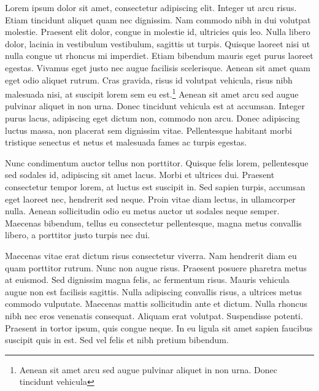 
{}
Lorem ipsum dolor sit amet, consectetur adipiscing elit.\citep{Nacuzzi:2007} Integer ut arcu risus. Etiam tincidunt aliquet quam nec dignissim. Nam commodo nibh in dui volutpat molestie. Praesent elit dolor, congue in molestie id, ultricies quis leo. Nulla libero dolor, lacinia in vestibulum vestibulum, sagittis ut turpis. Quisque laoreet nisi ut nulla congue ut rhoncus mi imperdiet. Etiam bibendum mauris eget purus laoreet egestas.\citep{Cooper:1939} Vivamus eget justo nec augue facilisis scelerisque. Aenean sit amet quam eget odio aliquet rutrum. Cras gravida, risus id volutpat vehicula, risus nibh malesuada nisi, at suscipit lorem sem eu est.\footnote{Aenean sit amet arcu sed augue pulvinar aliquet in non urna. Donec tincidunt vehicula} Aenean sit amet arcu sed augue pulvinar aliquet in non urna. Donec tincidunt vehicula est at accumsan. Integer purus lacus, adipiscing eget dictum non, commodo non arcu. Donec adipiscing luctus massa, non placerat sem dignissim vitae. Pellentesque habitant morbi tristique senectus et netus et malesuada fames ac turpis egestas.\citep{Fernandez:1892,carlin2010linguistics}

Nunc condimentum auctor tellus non porttitor.\citep{Febre:2005,algonquina:wigwams:online} Quisque felis lorem, pellentesque sed sodales id, adipiscing sit amet lacus. Morbi et ultrices dui. Praesent consectetur tempor lorem, at luctus est suscipit in. Sed sapien turpis, accumsan eget laoreet nec, hendrerit sed neque. Proin vitae diam lectus, in ullamcorper nulla.\citep{Sultzman:1999} Aenean sollicitudin odio eu metus auctor ut sodales neque semper. Maecenas bibendum, tellus eu consectetur pellentesque, magna metus convallis libero, a porttitor justo turpis nec dui.\citep{Britannica:Tehuelche:Online,Guia:Patagonia}

\lbpsepline

Maecenas vitae erat dictum risus consectetur viverra. Nam hendrerit diam eu quam porttitor rutrum. Nunc non augue risus. Praesent posuere pharetra metus at euismod. Sed dignissim magna felis, ac fermentum risus.\citep{Advent:2009} Mauris vehicula augue non est facilisis sagittis. Nulla adipiscing convallis risus, a ultrices metus commodo vulputate. Maecenas mattis sollicitudin ante et dictum. Nulla rhoncus nibh nec eros venenatis consequat. Aliquam erat volutpat.\citep{algonquina:lengua:online} Suspendisse potenti. Praesent in tortor ipsum, quis congue neque. In eu ligula sit amet sapien faucibus suscipit quis in est. Sed vel felis et nibh pretium bibendum.

